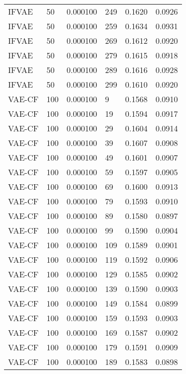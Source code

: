 \begin{tabular}{llrlrr}
   IFVAE &   50 &  0.000100 &   249 &  0.1620 &       0.0926 \\
   IFVAE &   50 &  0.000100 &   259 &  0.1634 &       0.0931 \\
   IFVAE &   50 &  0.000100 &   269 &  0.1612 &       0.0920 \\
   IFVAE &   50 &  0.000100 &   279 &  0.1615 &       0.0918 \\
   IFVAE &   50 &  0.000100 &   289 &  0.1616 &       0.0928 \\
   IFVAE &   50 &  0.000100 &   299 &  0.1610 &       0.0920 \\
  VAE-CF &  100 &  0.000100 &     9 &  0.1568 &       0.0910 \\
  VAE-CF &  100 &  0.000100 &    19 &  0.1594 &       0.0917 \\
  VAE-CF &  100 &  0.000100 &    29 &  0.1604 &       0.0914 \\
  VAE-CF &  100 &  0.000100 &    39 &  0.1607 &       0.0908 \\
  VAE-CF &  100 &  0.000100 &    49 &  0.1601 &       0.0907 \\
  VAE-CF &  100 &  0.000100 &    59 &  0.1597 &       0.0905 \\
  VAE-CF &  100 &  0.000100 &    69 &  0.1600 &       0.0913 \\
  VAE-CF &  100 &  0.000100 &    79 &  0.1593 &       0.0910 \\
  VAE-CF &  100 &  0.000100 &    89 &  0.1580 &       0.0897 \\
  VAE-CF &  100 &  0.000100 &    99 &  0.1590 &       0.0904 \\
  VAE-CF &  100 &  0.000100 &   109 &  0.1589 &       0.0901 \\
  VAE-CF &  100 &  0.000100 &   119 &  0.1592 &       0.0906 \\
  VAE-CF &  100 &  0.000100 &   129 &  0.1585 &       0.0902 \\
  VAE-CF &  100 &  0.000100 &   139 &  0.1590 &       0.0903 \\
  VAE-CF &  100 &  0.000100 &   149 &  0.1584 &       0.0899 \\
  VAE-CF &  100 &  0.000100 &   159 &  0.1593 &       0.0903 \\
  VAE-CF &  100 &  0.000100 &   169 &  0.1587 &       0.0902 \\
  VAE-CF &  100 &  0.000100 &   179 &  0.1591 &       0.0909 \\
  VAE-CF &  100 &  0.000100 &   189 &  0.1583 &       0.0898 \\

\end{tabular}
